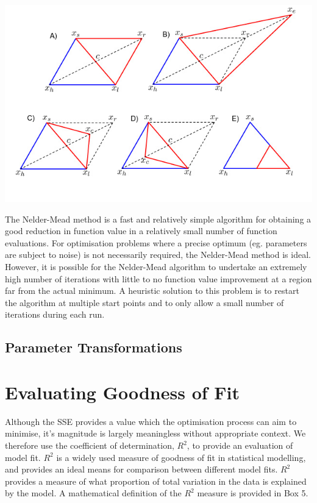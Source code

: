 \begin{framed}
\begin{center}
  \includegraphics[width=15cm]{nelder.png}
\end{center}

The Nelder-Mead method is a fast and relatively simple
algorithm for obtaining a good reduction in function value in a
relatively small number of function evaluations. For optimisation
problems where a precise optimum (eg. parameters are subject to noise)
is not necessarily required, the Nelder-Mead method is ideal. However, it is possible for the
Nelder-Mead algorithm to undertake an extremely high number of
iterations with little to no function value improvement at a region
far from the actual minimum. A heuristic solution to this problem is
to restart the algorithm at multiple start points and to only allow a
small number of iterations during each run.\cite{nelder,singer}
 
\end{framed}


\subsection{Parameter Transformations}



\section{Evaluating Goodness of Fit}
Although the SSE provides a value which the optimisation process can
aim to minimise, it's magnitude is largely meaningless without
appropriate context. We therefore use the coefficient of
determination, $R^2$, to provide an evaluation of model fit. $R^2$ is
a widely used measure of goodness of fit in statistical modelling, and
provides an ideal means for comparison between different model
fits. $R^2$ provides a measure of what proportion of total variation
in the data is explained by the model. A mathematical definition of
the $R^2$ measure is provided in Box 5.


